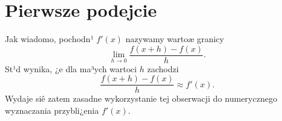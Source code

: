 \documentclass[11pt,leqno]{article}
\begin{document}
\section{Pierwsze podejcie}                                  \label{S:Pierwsze}
\setcounter{equation}{0}


Jak wiadomo, pochodn¹ $f'(x)$ nazywamy wartoæ granicy
$$
\lim_{h\to0}\frac{f(x+h)-f(x)}{h}.
$$
St¹d wynika, ¿e dla ma³ych wartoci $h$ zachodzi
$$
\frac{f(x+h)-f(x)}{h}\approx f'(x).
$$
Wydaje siê zatem zasadne wykorzystanie tej obserwacji do numerycznego
wyznaczania przybli¿enia $f'(x)$.
\end{document}
